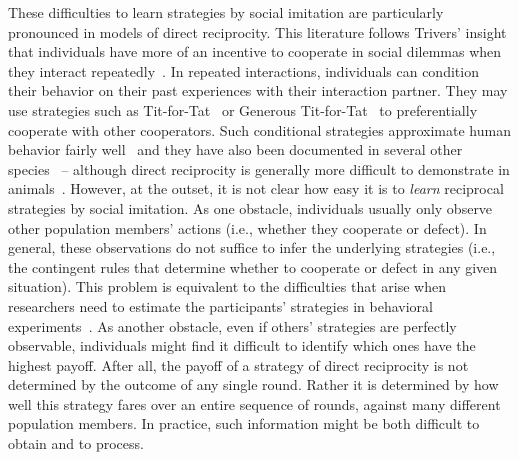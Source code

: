 \documentclass[11pt]{article}
\theoremstyle{plainCl1}
\theoremstyle{plainCl2}
\begin{document}
These difficulties to learn strategies by social imitation are particularly pronounced in models of direct reciprocity. 
This literature follows Trivers' insight that individuals have more of an incentive to cooperate in social dilemmas when they interact repeatedly~\citep{trivers1971evolution}. 
In repeated interactions, individuals can condition their behavior on their past experiences with their interaction partner. 
They may use strategies such as Tit-for-Tat~\citep{rapoport:book:1965,axelrod1981evolution} or Generous Tit-for-Tat~\citep{molander:jcr:1985,Nowak1992tit} to preferentially cooperate with other cooperators. 
Such conditional strategies approximate human behavior fairly well~\citep{fischbacher:EconL:2001,Rand:TCS:2013,DalBo:AER:2019,Rossetti:ETH:2023} and they have also been documented in several other species~\citep{Carter:PRSB:2013,Schweinfurth:AnBehav:2019,Voelkl:PNAS:2015} -- although direct reciprocity is generally more difficult to demonstrate in animals~\citep{CluttonBrock:Nature:2009,Silk:CurrentBiology:2013,taborsky:CurrentBiology:2013}.
However, at the outset, it is not clear how easy it is to {\it learn} reciprocal strategies by social imitation. 
As one obstacle, individuals usually only observe other population members' actions (i.e., whether they cooperate or defect). 
In general, these observations do not suffice to infer the underlying strategies (i.e., the contingent rules that determine whether to cooperate or defect in any given situation). 
This problem is equivalent to the difficulties that arise when researchers need to estimate the participants' strategies in behavioral experiments~\citep{Rossetti:ETH:2023}. 
As another obstacle, even if others' strategies are perfectly observable, individuals might find it difficult to identify which ones have the highest payoff. 
After all, the payoff of a strategy of direct reciprocity is not determined by the outcome of any single round.
Rather it is determined by how well this strategy fares over an entire sequence of rounds, against many different population members. 
In practice, such information might be both difficult to obtain and to process. 

\end{document}
